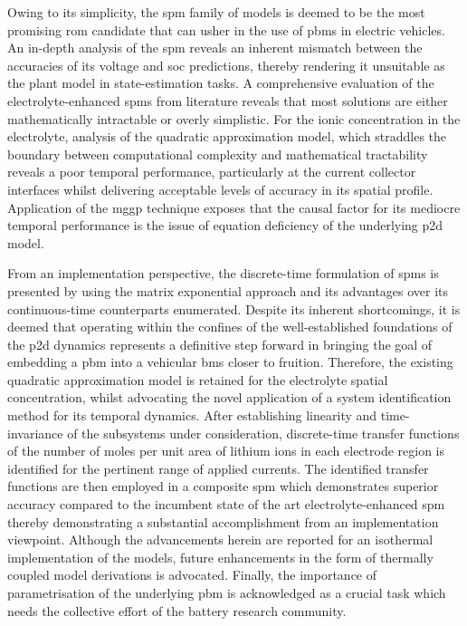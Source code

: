 Owing to its simplicity, the \gls{spm} family of models is deemed to be the most
promising  \gls{rom} candidate  that  can usher  in the  use  of \glspl{pbm}  in
electric vehicles.  An in-depth  analysis of the  \gls{spm} reveals  an inherent
mismatch  between  the accuracies  of  its  voltage and  \gls{soc}  predictions,
thereby rendering it unsuitable as the  plant model in state-estimation tasks. A
comprehensive evaluation of the electrolyte-enhanced \glspl{spm} from literature
reveals  that most  solutions are  either mathematically  intractable or  overly
simplistic.  For  the  ionic  concentration  in  the  electrolyte,  analysis  of
the  quadratic  approximation  model,   which  straddles  the  boundary  between
computational complexity  and mathematical tractability reveals  a poor temporal
performance, particularly at the  current collector interfaces whilst delivering
acceptable  levels  of accuracy  in  its  spatial  profile. Application  of  the
\gls{mggp} technique  exposes that the  causal factor for its  mediocre temporal
performance  is the  issue of  equation deficiency  of the  underlying \gls{p2d}
model.

From an implementation perspective, the discrete-time formulation of \glspl{spm}
is presented  by using the matrix  exponential approach and its  advantages over
its continuous-time counterparts enumerated.  Despite its inherent shortcomings,
it  is  deemed  that  operating  within the  confines  of  the  well-established
foundations  of the  \gls{p2d}  dynamics represents  a  definitive step  forward
in  bringing the  goal  of  embedding a  \gls{pbm}  into  a vehicular  \gls{bms}
closer to  fruition. Therefore,  the existing  quadratic approximation  model is
retained for the electrolyte spatial  concentration, whilst advocating the novel
application  of  a  system  identification method  for  its  temporal  dynamics.
After  establishing  linearity  and  time-invariance  of  the  subsystems  under
consideration, discrete-time transfer functions of  the number of moles per unit
area of  lithium ions in each  electrode region is identified  for the pertinent
range of applied  currents. The identified transfer functions  are then employed
in a  composite \gls{spm} which  demonstrates superior accuracy compared  to the
incumbent state of the  art electrolyte-enhanced \gls{spm} thereby demonstrating
a  substantial accomplishment  from  an implementation  viewpoint. Although  the
advancements  herein  are  reported  for an  isothermal  implementation  of  the
models, future enhancements  in the form of thermally  coupled model derivations
is  advocated. Finally,  the  importance of  parametrisation  of the  underlying
\gls{pbm} is acknowledged as a crucial task which needs the collective effort of
the battery research community.






